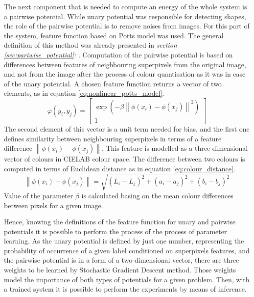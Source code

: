 The next component that is needed to compute an energy of the whole system is a pairwise potential. While unary potential was responsible for detecting shapes, the role of the pairwise potential is to remove noises from images. For this part of the system, feature function based on Potts model was used. The general definition of this method was already presented in \textit{section \ref{sec:pariwise_potential}: }. Computation of the pairwise potential is based on differences between features of neighbouring superpixels from the original image, and not from the image after the process of colour quantisation as it was in case of the unary potential. A chosen feature function returns a vector of two elements, as in equation \ref{eq:nonlinear_potts_model}.
\begin{equation}
    \label{eq:nonlinear_potts_model}
    \varphi(y_i,y_j) = \begin{bmatrix}
        \exp{(-\beta \left \| \phi(x_i) - \phi(x_j)\right \|^2)} \\
        1
    \end{bmatrix}
\end{equation}
The second element of this vector is a unit term needed for bias, and the first one defines similarity between neighbouring superpixels in terms of a feature difference $ \left \| \phi(x_i) - \phi(x_j)\right \|$. This feature is modelled as a three-dimensional vector of colours in CIELAB colour space. The difference between two colours is computed in terms of Euclidean distance as in equation \ref{eq:colour_distance}. 
\begin{equation}
    \label{eq:colour_distance}
    \left \| \phi(x_i) - \phi(x_j)\right \|=\sqrt {(L_i-L_j)^2+(a_i-a_j)^2+(b_i-b_j)^2}
\end{equation}
Value of the parameter $\beta$ is calculated basing on the mean colour differences between pixels for a given image.

Hence, knowing the definitions of the feature function for unary and pairwise potentials it is possible to perform the process of the process of parameter learning. As the unary potential is defined by just one number, representing the probability of occurrence of a given label conditioned on superpixels features, and the pairwise potential is in a form of a two-dimensional vector, there are three weights to be learned by Stochastic Gradient Descent method. Those weights model the importance of both types of potentials for a given problem. Then, with a trained system it is possible to perform the experiments by means of inference.